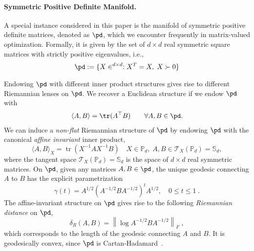 \documentclass[twoside,11pt]{article}
\begin{document}
\paragraph{Symmetric Positive Definite Manifold.}
A special instance considered in this paper is the manifold of symmetric positive definite matrices, denoted as $\pd$, which we encounter frequently in matrix-valued optimization. Formally, it is given by the set of $d \times d$ real symmetric square matrices with strictly positive eigenvalues, i.e., 
\begin{equation*}
    \pd := \{ X \in \real^{d\times d}: X^T=X, \; X \succ 0 \}
\end{equation*}

Endowing $\pd$ with different inner product structures gives rise to different Riemannian lenses on $\pd$. We recover a Euclidean structure if we endow $\pd$ with 
\[
\langle A, B \rangle = \tr(A^\top B) \qquad \forall A,B \in \pd.
\]
We can induce a \textit{non-flat} Riemannian structure of $\pd$ by endowing $\pd$ with the canonical \textit{affine invariant} inner product, 
\[\langle A, B\rangle_X=\operatorname{tr}\left(X^{-1} A X^{-1} B\right) \quad X \in \mathbb{P}_d, \; A, B \in \mathcal{T}_X\left(\mathbb{P}_d\right)=\mathbb{S}_d,\]
where the tangent space $\mathcal{T}_X\left(\mathbb{P}_d\right)=\mathbb{S}_d$ is the space of $d\times d$ real symmetric matrices. On $\pd$, given any matrices $A,B \in \pd$, the unique geodesic connecting $A$ to $B$ has the explicit parametrization
\begin{equation}\label{eq:intro_gcvx_def}
    \gamma(t)=A^{1 / 2}\left(A^{-1 / 2} B A^{-1 / 2}\right)^t A^{1 / 2}, \quad 0 \leq t \leq 1 \; .
\end{equation}
The affine-invariant structure on $\pd$ gives rise to the following \textit{Riemannian distance} on $\pd$, 
\[
\delta_{R}(A, B)=\left\|\log A^{-1 / 2} B A^{-1 / 2}\right\|_F \; ,
\]
which corresponds to the length of the geodesic connecting $A$ and $B$. It is geodesically convex, since $\pd$ is Cartan-Hadamard~\citep{bacak2014convex, bhatia07positivedefinitematrices}.
\end{document}
